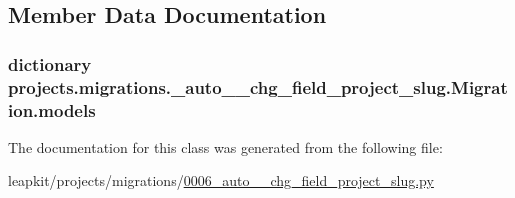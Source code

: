 \subsection{Member Data Documentation}
\hypertarget{classprojects_1_1migrations_1_10006__auto____chg__field__project__slug_1_1_migration_ac062189ac058281c8d98f29ee61e3733}{
\subsubsection[{models}]{\setlength{\rightskip}{0pt plus 5cm}dictionary projects.\-migrations.\-\_\-auto\-\_\-\-\_\-chg\-\_\-field\-\_\-project\-\_\-slug.\-Migration.\-models\hspace{0.3cm}{\ttfamily [static]}}}\label{classprojects_1_1migrations_1_10006__auto____chg__field__project__slug_1_1_migration_ac062189ac058281c8d98f29ee61e3733}


The documentation for this class was generated from the following file\-:\begin{DoxyCompactItemize}
\item 
leapkit/projects/migrations/\hyperlink{0006__auto____chg__field__project__slug_8py}{0006\-\_\-auto\-\_\-\-\_\-chg\-\_\-field\-\_\-project\-\_\-slug.\-py}\end{DoxyCompactItemize}
